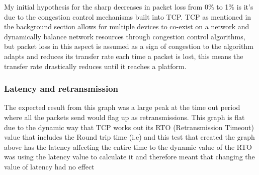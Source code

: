 My initial hypothesis for the sharp decreases in packet loss from 0\% to 1\% is it's due to the congestion control mechanisms built into TCP. TCP as mentioned in the background section allows for multiple devices to co-exist on a network and dynamically balance network resources through congestion control algorithms, but packet loss in this aspect is assumed as a sign of congestion to the algorithm adapts and reduces its transfer rate each time a packet is lost, this means the transfer rate drastically reduces until it reaches a platform.



\subsubsection{Latency and retransmission}

The expected result from this graph was a large peak at the time out period where all the packets send would flag up as retransmissions. This graph is flat due to the dynamic way that TCP works out its RTO (Retransmission Timeout) value that includes the Round trip time (i.e) and this test that created the graph above has the latency affecting the entire time to the dynamic value of the RTO was using the latency value to calculate it and therefore meant that changing the value of latency had no effect 





